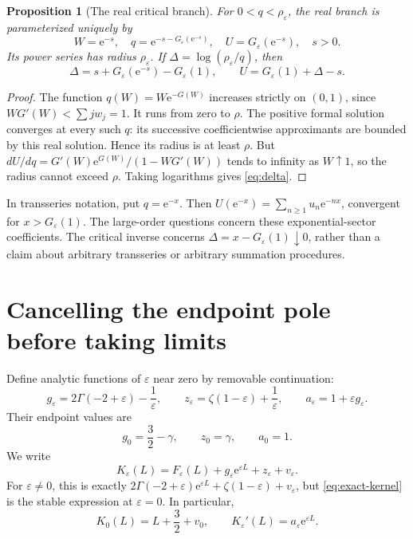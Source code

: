 \documentclass[11pt,a4paper]{article}
\numberwithin{equation}{section}
\newtheorem{proposition}[theorem]{Proposition}
\theoremstyle{definition}
\theoremstyle{remark}
\newcommand{\eps}{\varepsilon}
\newcommand{\ee}{\mathrm e}
\newcommand{\FF}{F_{\eps}}
\newcommand{\KK}{K_{\eps}}
\begin{document}
\begin{proposition}[The real critical branch]
\label{prop:branch}
For \(0<q<\rho_{\eps}\), the real branch is parameterized uniquely by
\begin{equation}
 W=\ee^{-s},\quad q=\ee^{-s-G_{\eps}(\ee^{-s})},\quad
 U=G_{\eps}(\ee^{-s}),\quad s>0.
 \label{eq:param}
\end{equation}
Its power series has radius \(\rho_{\eps}\). If
\(\Delta=\log(\rho_{\eps}/q)\), then
\begin{equation}
 \Delta=s+G_{\eps}(\ee^{-s})-G_{\eps}(1),\qquad
 U=G_{\eps}(1)+\Delta-s.
 \label{eq:delta}
\end{equation}
\end{proposition}
\begin{proof}
The function \(q(W)=W\ee^{-G(W)}\) increases strictly on \((0,1)\), since
\(WG'(W)<\sum jw_j=1\). It runs from zero to \(\rho\).
The positive formal solution converges at every such \(q\): its successive
coefficientwise approximants are bounded by this real solution. Hence its
radius is at least \(\rho\). But
\(dU/dq=G'(W)\ee^{G(W)}/(1-WG'(W))\) tends to infinity as \(W\uparrow1\),
so the radius cannot exceed \(\rho\). Taking logarithms gives
\eqref{eq:delta}.
\end{proof}

In transseries notation, put \(q=\ee^{-x}\). Then
\(U(\ee^{-x})=\sum_{n\ge1}u_n\ee^{-nx}\), convergent for
\(x>G_{\eps}(1)\). The large-order questions concern these exponential-sector
coefficients. The critical inverse concerns
\(\Delta=x-G_{\eps}(1)\downarrow0\), rather than a claim about arbitrary
transseries or arbitrary summation procedures.

\section{Cancelling the endpoint pole before taking limits}
\label{sec:kernel}

Define analytic functions of \(\eps\) near zero by removable continuation:
\begin{equation}
 g_{\eps}=2\Gamma(-2+\eps)-\frac1\eps,\qquad
 z_{\eps}=\zeta(1-\eps)+\frac1\eps,\qquad
 a_{\eps}=1+\eps g_{\eps}.
 \label{eq:regularized-constants}
\end{equation}
Their endpoint values are
\begin{equation}
 g_0=\frac32-\gamma,\qquad z_0=\gamma,\qquad a_0=1.
 \label{eq:regularized-values}
\end{equation}
We write
\begin{equation}
 \KK(L)=\FF(L)+g_{\eps}\ee^{\eps L}+z_{\eps}+v_{\eps}.
 \label{eq:exact-kernel}
\end{equation}
For \(\eps\ne0\), this is exactly
\(2\Gamma(-2+\eps)\ee^{\eps L}+\zeta(1-\eps)+v_{\eps}\),
but \eqref{eq:exact-kernel} is the stable expression at \(\eps=0\).
In particular,
\begin{equation}
 K_0(L)=L+\frac32+v_0,
 \qquad \KK'(L)=a_{\eps}\ee^{\eps L}.
 \label{eq:kernel-derivative}
\end{equation}
\end{document}
